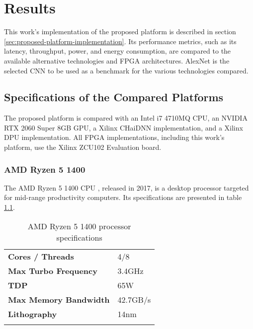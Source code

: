 \chapter{Results}
This work's implementation of the proposed platform is described in section \ref{sec:proposed-platform-implementation}. Its performance metrics, such as its latency, throughput, power, and energy consumption, are compared to the available alternative technologies and FPGA architectures. AlexNet is the selected CNN to be used as a benchmark for the various technologies compared.

\section{Specifications of the Compared Platforms}
The proposed platform is compared with an Intel i7 4710MQ CPU, an NVIDIA RTX 2060 Super 8GB GPU, a Xilinx CHaiDNN implementation, and a Xilinx DPU implementation. All FPGA implementations, including this work's platform, use the Xilinx ZCU102 Evaluation board.

\subsection{AMD Ryzen 5 1400}
The AMD Ryzen 5 1400 CPU \cite{AMD-Ryzen-5-1400-Processor}, released in 2017, is a desktop processor targeted for mid-range productivity computers. Its specifications are presented in table \ref{tab:AMD-Ryzen-5-1400-specs}.

\begin{table}[H]
	\caption{AMD Ryzen 5 1400 processor specifications}
	\label{tab:AMD-Ryzen-5-1400-specs}
	\centering
	\begin{tabular}{ll}
		\toprule
		\textbf{Cores / Threads} & 4/8\\
		\textbf{Max Turbo Frequency} & 3.4GHz\\
		\textbf{TDP} & 65W\\
		\textbf{Max Memory Bandwidth} & 42.7GB/s\\
		\textbf{Lithography} & 14nm\\
		\bottomrule\\
	\end{tabular}
\end{table}


